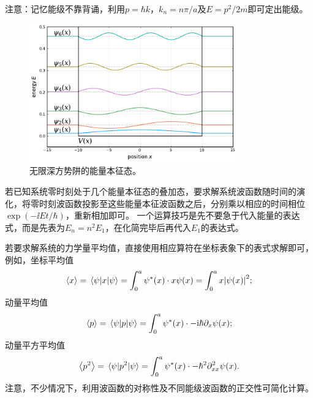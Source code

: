 注意：记忆能级不靠背诵，利用$p=\hbar k$，$k_n=n\pi/a$及$E=p^2/2m$即可定出能级。

\begin{figure}[ht]
    \centering
    \includegraphics[width=0.8\textwidth]{figures/sec3_figures/infinite_well_eigenstates.pdf}
    \caption{无限深方势阱的能量本征态。}
\end{figure}

若已知系统零时刻处于几个能量本征态的叠加态，要求解系统波函数随时间的演化，将零时刻波函数投影至这些能量本征波函数之后，分别乘以相应的时间相位$\exp(-\ii E t/\hbar)$，重新相加即可。
一个运算技巧是先不要急于代入能量的表达式，而是先表为$E_n=n^2 E_1$，在化简完毕后再代入$E_1$的表达式。

若要求解系统的力学量平均值，直接使用相应算符在坐标表象下的表式求解即可，例如，坐标平均值
\begin{equation}
    \expval{x} = \mel{\psi}{x}{\psi} = \int_0^a \psi^*(x) \cdot x \psi(x) = \int_0^a x \abs{\psi(x)}^2;
\end{equation}
动量平均值
\begin{equation}
    \expval{p} = \mel{\psi}{p}{\psi} = \int_0^a \psi^*(x) \cdot -\mathrm{i}\hbar\partial_x \psi(x);
\end{equation}
动量平方平均值
\begin{equation}
    \expval{p^2} = \mel{\psi}{p^2}{\psi} = \int_0^a \psi^*(x) \cdot -\hbar^2\partial_{xx}^2 \psi(x).
\end{equation}
注意，不少情况下，利用波函数的对称性及不同能级波函数的正交性可简化计算。

